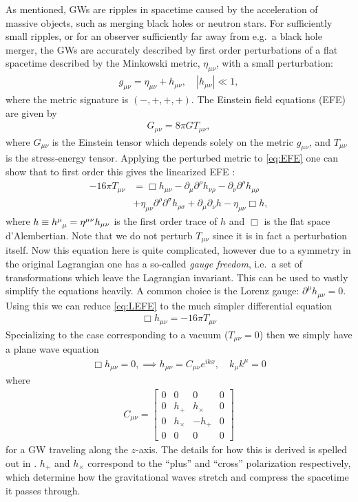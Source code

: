 \documentclass[%
reprint,
amsmath,amssymb,
aps,
]{revtex4-2}
\newcommand{\p}{\partial}
\begin{document}
As mentioned, GWs are ripples in spacetime caused by the acceleration of massive objects, such as merging black holes or neutron stars. For sufficiently small ripples, or for an observer sufficiently far away from e.g.~a black hole merger, the GWs are accurately described by first order perturbations of a flat spacetime described by the Minkowski metric, $\eta_{\mu\nu}$, with a small perturbation:
\begin{align}
	g_{\mu\nu}=\eta_{\mu\nu}+h_{\mu\nu},\quad|h_{\mu\nu}|\ll1,
\end{align}
where the metric signature is $(-,+,+,+)$. The Einstein field equations (EFE) are given by
\begin{align}
	G_{\mu\nu}=8\pi GT_{\mu\nu},
	\label{eq:EFE}
\end{align}
where $G_{\mu\nu}$ is the Einstein tensor which depends solely on the metric $g_{\mu\nu}$, and $T_{\mu\nu}$ is the stress-energy tensor. Applying the perturbed metric to \eqref{eq:EFE} one can show that to first order this gives the linearized EFE \cite{Carroll}:
\begin{align}
	-16\pi T_{\mu\nu}&=\Box h_{\mu\nu}-\p_\mu\p^\rho h_{\nu\rho}-\p_\nu\p^\rho h_{\mu\rho}\nonumber\\
	&+\eta_{\mu\nu}\p^\rho\p^\sigma h_{\rho\sigma}+\p_\mu \p_\nu h-\eta_{\mu\nu}\Box h,
	\label{eq:LEFE}
\end{align}
where $h\equiv \tensor{h}{^\mu_\mu}=\eta^{\mu\nu}h_{\mu\nu}$ is the first order trace of $h$ and $\Box$ is the flat space d'Alembertian. Note that we do not perturb $T_{\mu\nu}$ since it is in fact a perturbation itself. Now this equation here is quite complicated, however due to a symmetry in the original Lagrangian one has a so-called \textit{gauge freedom}, i.e.~a set of transformations which leave the Lagrangian invariant. This can be used to vastly simplify the equations heavily. A common choice is the Lorenz gauge: $\p^\mu h_{\mu\nu}=0$. Using this we can reduce \eqref{eq:LEFE} to the much simpler differential equation
\begin{align}
	\Box h_{\mu\nu}=-16\pi T_{\mu\nu}
\end{align}
Specializing to the case corresponding to a vacuum ($T_{\mu\nu}=0$) then we simply have a plane wave equation
\begin{align}
	\Box h_{\mu\nu}=0,\implies h_{\mu\nu}=C_{\mu\nu}e^{ikx},\quad k_\mu k^\mu=0
\end{align}
where
\begin{align}
	C_{\mu\nu}=\begin{bmatrix}
		0&0&0&0\\
		0&h_+&h_\times&0\\
		0&h_\times&-h_+&0\\
		0&0&0&0
	\end{bmatrix}
\end{align}
for a GW traveling along the $z$-axis. The details for how this is derived is spelled out in \cite{Carroll}. $h_+$ and $h_\times$ correspond to the ``plus'' and ``cross'' polarization respectively, which determine how the gravitational waves stretch and compress the spacetime it passes through. 
\end{document}
